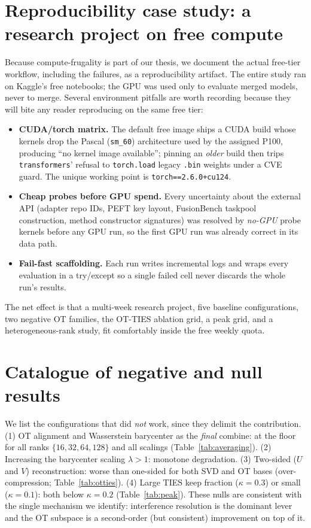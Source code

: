 \documentclass[11pt]{article}
\newcommand{\otties}{\textsc{OT-TIES}}
\begin{document}
\section{Reproducibility case study: a research project on free compute}
\label{app:freecompute}
Because compute-frugality is part of our thesis, we document the actual free-tier workflow, including the
failures, as a reproducibility artifact. The entire study ran on Kaggle's free notebooks; the GPU was
used only to evaluate merged models, never to merge. Several environment pitfalls are worth recording
because they will bite any reader reproducing on the same free tier:
\begin{itemize}[leftmargin=1.4em,itemsep=2pt]
\item \textbf{CUDA/torch matrix.} The default free image ships a CUDA build whose kernels drop the Pascal
(\texttt{sm\_60}) architecture used by the assigned P100, producing ``no kernel image available'';
pinning an \emph{older} build then trips \texttt{transformers}' refusal to \texttt{torch.load} legacy
\texttt{.bin} weights under a CVE guard. The unique working point is \texttt{torch==2.6.0+cu124}.
\item \textbf{Cheap probes before GPU spend.} Every uncertainty about the external API (adapter repo IDs,
PEFT key layout, FusionBench taskpool construction, method constructor signatures) was resolved by
\emph{no-GPU} probe kernels before any GPU run, so the first GPU run was already correct in its data path.
\item \textbf{Fail-fast scaffolding.} Each run writes incremental logs and wraps every evaluation in a
try/except so a single failed cell never discards the whole run's results.
\end{itemize}
The net effect is that a multi-week research project, five baseline configurations, two negative OT
families, the \otties{} ablation grid, a peak grid, and a heterogeneous-rank study, fit comfortably
inside the free weekly quota.

\section{Catalogue of negative and null results}
\label{app:negatives}
We list the configurations that did \emph{not} work, since they delimit the contribution.
(1) OT alignment and Wasserstein barycenter as the \emph{final} combine: at the floor for all ranks
$\{16,32,64,128\}$ and all scalings (Table~\ref{tab:averaging}). (2) Increasing the barycenter scaling
$\lambda>1$: monotone degradation. (3) Two-sided ($U$ and $V$) reconstruction: worse than one-sided for
both SVD and OT bases (over-compression; Table~\ref{tab:otties}). (4) Large TIES keep fraction
($\kappa=0.3$) or small ($\kappa=0.1$): both below $\kappa=0.2$ (Table~\ref{tab:peak}). These nulls are
consistent with the single mechanism we identify: interference resolution is the dominant lever and the
OT subspace is a second-order (but consistent) improvement on top of it.
\end{document}
